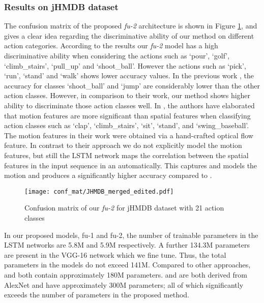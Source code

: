 \documentclass[10pt,twocolumn,letterpaper]{article}
\begin{document}
\vspace{-7 mm}
 \subsubsection{Results on jHMDB dataset}
 
 



The confusion matrix of the proposed \textit{fu-2} architecture is shown in Figure \ref{fig:fig4}, and gives a clear idea regarding the discriminative ability of our method on different action categories. According to the results our \textit{fu-2} model has a high discriminative ability when considering the actions such as `pour', `golf', `climb\_stairs', `pull\_up' and `shoot\_ball'. However the actions such as `pick', `run', `stand' and `walk' shows lower accuracy values.  In the previous work \cite{actiontubes}, the accuracy for classes `shoot\_ball' and `jump' are considerably lower than the other action classes. However, in comparison to their work, our method shows higher ability to discriminate those action classes well. In \cite{actiontubes}, the authors have elaborated that motion features are more significant than spatial features when classifying action classes such as `clap', `climb\_stairs', `sit', `stand', and `swing\_baseball'. The motion features in their work were obtained via a hand-crafted optical flow feature. In contrast to their approach we do not explicitly model the motion features, but still the LSTM network maps the correlation between the spatial features in the input sequence in an automatically. This captures and models the motion and produces a significantly higher accuracy compared to \cite{actiontubes}. 
          

 \begin{figure}[!h]
 \vspace{-2 mm}
        \begin{flushleft}
        	\texttt{[image: conf\_mat/JHMDB\_merged\_edited.pdf]}
	\vspace{-5 mm}
	\caption{Confusion matrix of our \textit{fu-2} for jHMDB dataset with 21 action classes}
	\label{fig:fig4}
        \end{flushleft}
        \vspace{-4 mm}
  \end{figure}
 \vspace{-5 mm}  
In our proposed models, fu-1 and fu-2, the number of trainable parameters in the LSTM networks are 5.8M and 5.9M respectively. A further 134.3M parameters are present in the VGG-16 network which we fine tune. Thus, the total parameters in the models do not exceed 141M. Compared to other approaches, \cite{actiontubes} and \cite{Simonyan2014} both contain approximately 180M parameters. \cite{Jeff2015} and \cite{Ravanbakhsh15} are both derived from AlexNet and have approximately 300M parameters; all of which significantly exceeds the number of parameters in the proposed method. 
\end{document}
